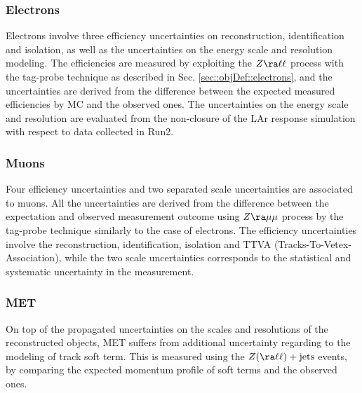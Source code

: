 

\subsubsection{Electrons}
Electrons involve three efficiency uncertainties on reconstruction, identification and isolation, as well as the uncertainties on the energy scale and resolution modeling.
The efficiencies are measured by exploiting the $Z\ra\ell\ell$ process with the tag-probe technique as described in Sec. \ref{sec::objDef::electrons}, and the uncertainties are derived from the difference between the expected measured efficiencies by MC and the observed ones.
The uncertainties on the energy scale and resolution are evaluated from the non-closure of the LAr response simulation with respect to data collected in Run2.  \\



\subsubsection{Muons}
Four efficiency uncertainties and two separated scale uncertainties are associated to muons.
All the uncertainties are derived from the difference between the expectation and observed measurement outcome using $Z\ra\mu\mu$ process by the tag-probe technique similarly to the case of electrons. 
The efficiency uncertainties involve the reconstruction, identification, isolation and TTVA (Tracks-To-Vetex-Association), while the two scale uncertainties corresponds to the statistical and systematic uncertainty in the measurement. \\


\subsubsection{MET} 
On top of the propagated uncertainties on the scales and resolutions of the reconstructed objects, MET suffers from additional uncertainty regarding to the modeling of track soft term.
This is measured using the $Z (\ra\ell\ell)+\mathrm{jets}$ events, by comparing the expected momentum profile of soft terms and the observed ones.  \\


